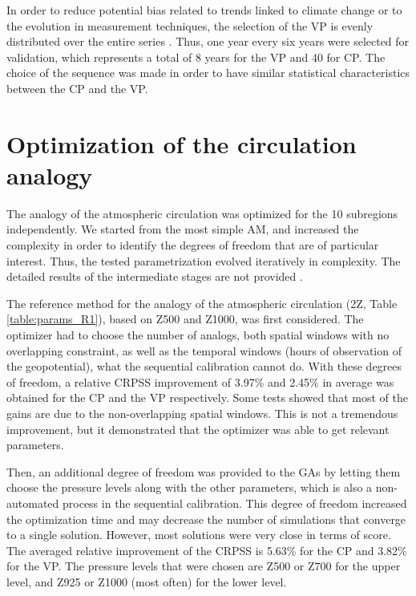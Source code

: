 \documentclass[review]{elsarticle}
\begin{document}
In order to reduce potential bias related to trends linked to climate change or to the evolution in measurement techniques, the selection of the VP is evenly distributed over the entire series \citep{BenDaoud2010}. Thus, one year every six years were selected for validation, which represents a total of 8 years for the VP and 40 for CP. The choice of the sequence was made in order to have similar statistical characteristics between the CP and the VP.


\section{Optimization of the circulation analogy}
\label{sec:optim_circul}

The analogy of the atmospheric circulation was optimized for the 10 subregions  independently. We started from the most simple AM, and increased the complexity in order to identify the degrees of freedom that are of particular interest. Thus, the tested parametrization evolved iteratively in complexity. The detailed results of the intermediate stages are not provided \citep[see][for the details]{Horton2012a}.

The reference method for the analogy of the atmospheric circulation (2Z, Table \ref{table:params_R1}), based on Z500 and Z1000, was first considered. The optimizer had to choose the number of analogs, both spatial windows with no overlapping constraint, as well as the temporal windows (hours of observation of the geopotential), what the sequential calibration cannot do. With these degrees of freedom, a relative CRPSS improvement of 3.97\% and 2.45\% in average was obtained for the CP and the VP respectively. Some tests showed that most of the gains are due to the non-overlapping spatial windows. This is not a tremendous improvement, but it demonstrated that the optimizer was able to get relevant parameters.

Then, an additional degree of freedom was provided to the GAs by letting them choose the pressure levels along with the other parameters, which is also a non-automated process in the sequential calibration. This degree of freedom increased the optimization time and may decrease the number of simulations that converge to a single solution. However, most solutions were very close in terms of score. The averaged relative improvement of the CRPSS is 5.63\% for the CP and 3.82\% for the VP. The pressure levels that were chosen are Z500 or Z700 for the upper level, and Z925 or Z1000 (most often) for the lower level.
\end{document}
